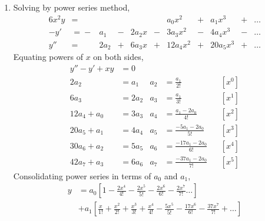 \begin{enumerate}
    \item Solving by power series method,
          \begin{alignat}{6}
              x^2 y & ={}       &       & {}        &        &
                    & a_0 x^2   & {}+{} & a_1x^3    & {}+{}  & \dots \\
              -y'   & ={}-{}    & a_1   & {}-{}     & 2a_2 x &
              {}-{} & 3a_3 x^2  & {}-{} & 4a_4 x^3  & {}-{}  & \dots \\
              y''   & ={}       & 2a_2  & {}+{}     & 6a_3 x &
              {}+{} & 12a_4 x^2 & {}+{} & 20a_5 x^3 & {}+{}  & \dots
          \end{alignat}
          Equating powers of $ x $ on both sides, \\
          \begin{align}
              y'' - y' + xy & = 0                                    \\
              2a_2          & = a_1                      &
              a_2           & = \frac{a_1}{2!}           &   & [x^0] \\
              6a_3          & = 2a_2                     &
              a_3           & = \frac{a_1}{3!}           &   & [x^1] \\
              12a_4 + a_0   & = 3a_3                     &
              a_4           & = \frac{a_1 - 2a_0}{4!}    &   & [x^2] \\
              20a_5 + a_1   & = 4a_4                     &
              a_5           & = \frac{-5a_1 - 2a_0}{5!}  &   & [x^3] \\
              30a_6 + a_2   & = 5a_5                     &
              a_6           & = \frac{-17a_1 - 2a_0}{6!} &   & [x^4] \\
              42a_7 + a_3   & = 6a_6                     &
              a_7           & = \frac{-37a_1 - 2a_0}{7!} &   & [x^5]
          \end{align}
          Consolidating power series in terms of $ a_0 $ and $ a_1 $,
          \begin{align}
              y & = a_0\left[ 1 - \frac{2x^4}{4!}
              - \frac{2x^5}{5!} - \frac{2x^6}{6!} - \frac{2x^7}{7!} \dots \right] \\
                & + a_1 \left[ \frac{x}{1!} + \frac{x^2}{2!}
                  + \frac{x^3}{3!} + \frac{x^4}{4!} - \frac{5x^5}{5!}
                  - \frac{17x^6}{6!} - \frac{37x^7}{7!} + \dots \right]
          \end{align}


\end{enumerate}
